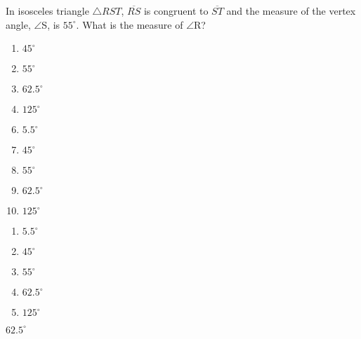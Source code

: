 In isosceles triangle $\bigtriangleup \textit{RST}$, $\overline{\textit{RS}}$ is congruent to $\overline{\textit{ST}}$ and the measure of the vertex angle, $\angle$S, is $55^\circ$. What is the measure of $\angle$R?

\ifsat
	\begin{enumerate}[label=\Alph*)]
		\item  $45^\circ$ 
		\item  $55^\circ$ 
		\item  $62.5^\circ$ %
		\item  $125^\circ$  
	\end{enumerate}
\else
\fi

\ifacteven
	\begin{enumerate}[label=\textbf{\Alph*.},itemsep=\fill,align=left]
		\setcounter{enumii}{5}
		\item   $5.5^\circ$
		\item  $45^\circ$ 
		\item  $55^\circ$ 
		\addtocounter{enumii}{1}
		\item  $62.5^\circ$ %
		\item  $125^\circ$ 
	\end{enumerate}
\else
\fi

\ifactodd
	\begin{enumerate}[label=\textbf{\Alph*.},itemsep=\fill,align=left]
		\item   $5.5^\circ$
		\item  $45^\circ$ 
		\item  $55^\circ$ 
		\item  $62.5^\circ$ %
		\item  $125^\circ$ 
	\end{enumerate}
\else
\fi

\ifgridin
  $62.5^\circ$ %
		
\else
\fi

